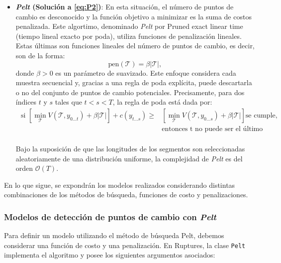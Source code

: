\documentclass{article}[14pts]
\providecommand{\abs}[1]{\lvert#1\rvert}
\begin{document}
\begin{itemize}
        \item \textbf{\textit{Pelt} (Solución a \eqref{eq:P2})}: En esta situación, el número de puntos de cambio es desconocido y la función objetivo a minimizar es la suma de costos penalizada. Este algortimo, denominado \textit{Pelt} por Pruned exact linear time (tiempo lineal exacto por poda), utiliza funciones de penalización lineales. Estas últimas son funciones lineales del número de puntos de cambio, es decir, son de la forma:
          \begin{equation}
            \text{pen}(\mathcal{T})= \beta \abs{\mathcal{T}},
          \end{equation}
        donde $\beta >0$ es un parámetro de suavizado. Este enfoque considera cada muestra secuencial y, gracias a una regla de poda explícita, puede descartarla o no del conjunto de puntos de cambio potenciales. Precisamente, para dos índices $t$ y $s$ tales que $t < s < T$, la regla de poda está dada por:
          \begin{equation}
            \begin{aligned}
              \text{ si } \left[ \min_{\mathcal{T}} V(\mathcal{T}, y_{0 \dots t}) + \beta \abs{\mathcal{T}}\right] + c(y_{t \dots s}) \geq & \left[ \min_{\mathcal{T}} V(\mathcal{T}, y_{0 \dots s}) + \beta \abs{\mathcal{T}} \right] \text{se cumple, }\\
              & \text{entonces t no puede ser el último punto de cambio antes de T.} \\
            \end{aligned}
          \end{equation}
              
        Bajo la suposición de que las longitudes de los segmentos son seleccionadas aleatoriamente de una distribución uniforme, la complejidad de \textit{Pelt} es del orden $\mathcal{O}(T)$.

      \end{itemize}
    
    En lo que sigue, se expondrán los modelos realizados considerando distintas combinaciones de los métodos de búsqueda, funciones de costo y penalizaciones. 

    \subsubsection{Modelos de detección de puntos de cambio con \textit{Pelt}}

    Para definir un modelo utilizando el método de búsqueda Pelt, debemos considerar una función de costo y una penalización. En Ruptures, la clase \texttt{Pelt} implementa el algoritmo y posee los siguientes argumentos asociados:
\end{document}
